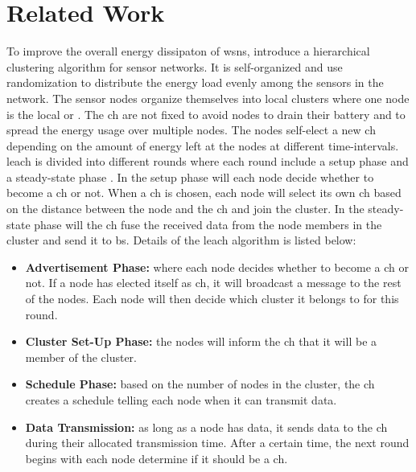 \documentclass[USenglish]{uit-thesis}
\begin{document}
\chapter{Related Work} \label{chap:related_work}
To improve the overall energy dissipaton of \gls{wsn}s,  \cite{leach} introduce a hierarchical clustering algorithm for sensor networks. It is self-organized and use randomization to distribute the energy load evenly among the sensors in the network. The sensor nodes organize themselves into local clusters where one node is the local  or . The \gls{ch} are not fixed to avoid nodes to drain their battery and to spread the energy usage over multiple nodes. The nodes self-elect a new \gls{ch} depending on the amount of energy left at the nodes at different time-intervals. \gls{leach} is divided into different rounds where each round include a setup phase and a steady-state phase \cite{tree_based}. In the setup phase will each node decide whether to become a \gls{ch} or not. When a \gls{ch} is chosen, each node will select its own \gls{ch} based on the distance between the node and the \gls{ch} and join the cluster. In the steady-state phase will the \gls{ch} fuse the received data from the node members in the cluster and send it to \gls{bs}. Details of the \gls{leach} algorithm is listed below:

\begin{itemize}
\item \textbf{Advertisement Phase:} where each node decides whether to become a \gls{ch} or not. If a node has elected itself as \gls{ch}, it will broadcast a message to the rest of the nodes. Each node will then decide which cluster it belongs to for this round.
\item \textbf{Cluster Set-Up Phase:} the nodes will inform the \gls{ch} that it will be a member of the cluster.
\item \textbf{Schedule Phase:} based on the number of nodes in the cluster, the \gls{ch} creates a schedule telling each node when it can transmit data.
\item \textbf{Data Transmission:} as long as a node has data, it sends data to the \gls{ch} during their allocated transmission time. After a certain time, the next round begins with each node determine if it should be a \gls{ch}. 
\end{itemize}
\end{document}
